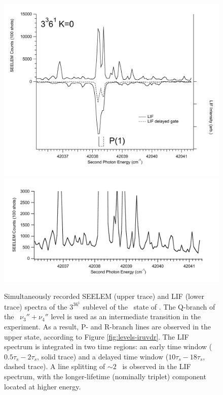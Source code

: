 \documentclass[12pt]{mitthesis}
\begin{document}
\begin{figure}
  \caption{Simultaneously recorded SEELEM (upper trace) and LIF (lower
    trace) spectra of the $3^36^1$  sublevel of the \astate\
    state of .  The Q-branch of the \xstate\ $\nu_3'' +
    \nu_4''$ level is used as an intermediate transition in the
    experiment.  As a result, P- and R-branch lines are observed in
    the upper state, according to Figure \ref{fig:levels-iruvdr}.  The
    LIF spectrum is integrated in two time regions: an early time
    window ($0.5\tau_s-2\tau_s$, solid trace) and a delayed time
    window ($10\tau_s-18\tau_s$, dashed trace).  A line splitting of
    $\sim 2$ \rcm\ is observed in the LIF spectrum, with the
    longer-lifetime (nominally triplet) component located at higher
    energy.}
  \label{fig:3361-p1}
  \centering
  \includegraphics[width=5.8in]{spectrum-3361-p1-split}
  \includegraphics[width=6in]{spectrum-3361-p1-zoom}
\end{figure}
\end{document}
